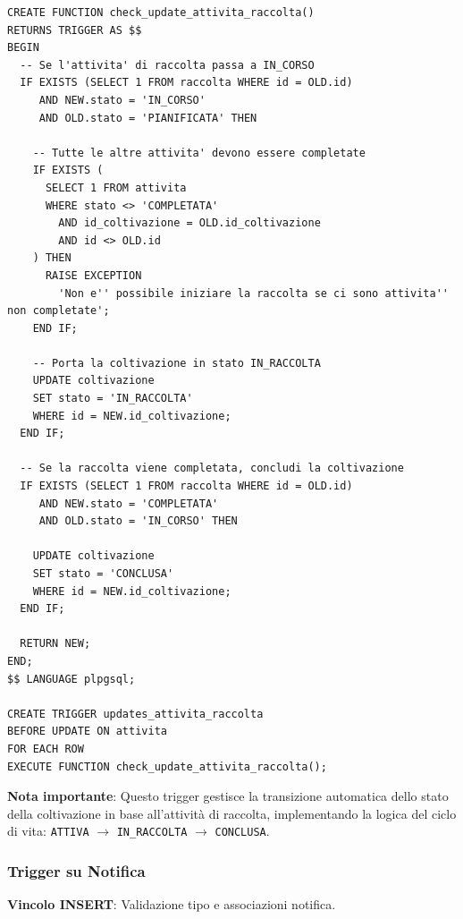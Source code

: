 \documentclass[12pt,a4paper]{article}
\begin{document}
\begin{lstlisting}[style=sqlstyle]
CREATE FUNCTION check_update_attivita_raccolta()
RETURNS TRIGGER AS $$
BEGIN
  -- Se l'attivita' di raccolta passa a IN_CORSO
  IF EXISTS (SELECT 1 FROM raccolta WHERE id = OLD.id) 
     AND NEW.stato = 'IN_CORSO' 
     AND OLD.stato = 'PIANIFICATA' THEN
    
    -- Tutte le altre attivita' devono essere completate
    IF EXISTS (
      SELECT 1 FROM attivita 
      WHERE stato <> 'COMPLETATA' 
        AND id_coltivazione = OLD.id_coltivazione 
        AND id <> OLD.id
    ) THEN 
      RAISE EXCEPTION 
        'Non e'' possibile iniziare la raccolta se ci sono attivita'' non completate';
    END IF;

    -- Porta la coltivazione in stato IN_RACCOLTA
    UPDATE coltivazione 
    SET stato = 'IN_RACCOLTA'
    WHERE id = NEW.id_coltivazione;
  END IF;

  -- Se la raccolta viene completata, concludi la coltivazione
  IF EXISTS (SELECT 1 FROM raccolta WHERE id = OLD.id) 
     AND NEW.stato = 'COMPLETATA' 
     AND OLD.stato = 'IN_CORSO' THEN
    
    UPDATE coltivazione
    SET stato = 'CONCLUSA'
    WHERE id = NEW.id_coltivazione;
  END IF;

  RETURN NEW;
END;
$$ LANGUAGE plpgsql;

CREATE TRIGGER updates_attivita_raccolta
BEFORE UPDATE ON attivita
FOR EACH ROW
EXECUTE FUNCTION check_update_attivita_raccolta();
\end{lstlisting}

\textbf{Nota importante}: Questo trigger gestisce la transizione automatica dello stato della coltivazione in base all'attività di raccolta, implementando la logica del ciclo di vita: \texttt{ATTIVA} $\to$ \texttt{IN\_RACCOLTA} $\to$ \texttt{CONCLUSA}.

\subsubsection{Trigger su Notifica}

\textbf{Vincolo INSERT}: Validazione tipo e associazioni notifica.
\end{document}
